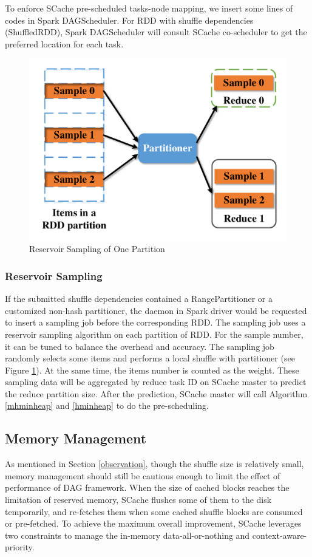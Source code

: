 To enforce SCache pre-scheduled tasks-node mapping, we insert some lines of codes in Spark DAGScheduler.
For RDD with shuffle dependencies (ShuffledRDD), Spark DAGScheduler will consult SCache co-scheduler to get the preferred location for each task.

\begin{figure}
	\centering
	\includegraphics[width=0.6\linewidth]{fig/sample}
	\caption{Reservoir Sampling of One Partition}
	\label{fig:sample}
	\vspace{-1em}
\end{figure}

\subsubsection{Reservoir Sampling}\label{sampling}
If the submitted shuffle dependencies contained a RangePartitioner or a customized non-hash partitioner, the daemon in Spark driver would be requested to insert a sampling job before the corresponding RDD. 
The sampling job uses a reservoir sampling algorithm \cite{reservoir} on each partition of RDD. 
For the sample number, it can be tuned to balance the overhead and accuracy. 
The sampling job randomly selects some items and performs a local shuffle with partitioner (see Figure \ref{fig:sample}). 
At the same time, the items number is counted as the weight. 
These sampling data will be aggregated by reduce task ID on SCache master to predict the reduce partition size. 
After the prediction, SCache master will call Algorithm \ref{mhminheap} and \ref{hminheap} to do the pre-scheduling.

\subsection{Memory Management}\label{memorymanage}
As mentioned in Section \ref{observation}, though the shuffle size is relatively small, memory management should still be cautious enough to limit the effect of performance of DAG framework.
When the size of cached blocks reaches the limitation of reserved memory, SCache flushes some of them to the disk temporarily, and re-fetches them when some cached shuffle blocks are consumed or pre-fetched. 
To achieve the maximum overall improvement, SCache leverages two constraints to manage the in-memory data-all-or-nothing and context-aware-priority.

